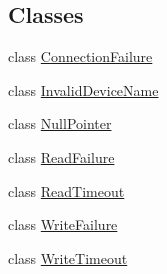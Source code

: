 \subsection*{\-Classes}
\begin{DoxyCompactItemize}
\item 
class \hyperlink{classmetrobotics_1_1Serial_1_1ConnectionFailure}{\-Connection\-Failure}
\item 
class \hyperlink{classmetrobotics_1_1Serial_1_1InvalidDeviceName}{\-Invalid\-Device\-Name}
\item 
class \hyperlink{classmetrobotics_1_1Serial_1_1NullPointer}{\-Null\-Pointer}
\item 
class \hyperlink{classmetrobotics_1_1Serial_1_1ReadFailure}{\-Read\-Failure}
\item 
class \hyperlink{classmetrobotics_1_1Serial_1_1ReadTimeout}{\-Read\-Timeout}
\item 
class \hyperlink{classmetrobotics_1_1Serial_1_1WriteFailure}{\-Write\-Failure}
\item 
class \hyperlink{classmetrobotics_1_1Serial_1_1WriteTimeout}{\-Write\-Timeout}
\end{DoxyCompactItemize}
